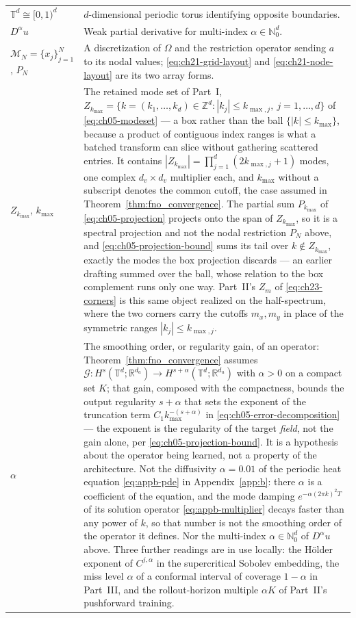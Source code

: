 {\begin{xltabular}{\textwidth}{@{}l>{\raggedright\arraybackslash}X@{}}
$\mathbb{T}^d \cong [0, 1)^d$ & $d$-dimensional periodic torus identifying opposite boundaries. \\
$D^\alpha u$ & Weak partial derivative for multi-index $\alpha \in \mathbb{N}_0^d$. \\
$\mathcal{M}_N = \{x_j\}_{j=1}^{N}$, $P_N$ & A discretization of $\Omega$ and the restriction operator sending $a$ to its nodal values; \eqref{eq:ch21-grid-layout} and \eqref{eq:ch21-node-layout} are its two array forms. \\
$Z_{k_{\max}}$, $k_{\max}$ & The retained mode set of Part~I, $Z_{k_{\max}} = \{k = (k_1, \dots, k_d) \in \mathbb{Z}^d : |k_j| \le k_{\max, j},\ j = 1, \dots, d\}$ of \eqref{eq:ch05-modeset} --- a box rather than the ball $\{|k| \le k_{\max}\}$, because a product of contiguous index ranges is what a batched transform can slice without gathering scattered entries. It contains $|Z_{k_{\max}}| = \prod_{j=1}^d (2k_{\max, j}+1)$ modes, one complex $d_v \times d_v$ multiplier each, and $k_{\max}$ without a subscript denotes the common cutoff, the case assumed in Theorem~\ref{thm:fno_convergence}. The partial sum $P_{k_{\max}}$ of \eqref{eq:ch05-projection} projects onto the span of $Z_{k_{\max}}$, so it is a spectral projection and not the nodal restriction $P_N$ above, and \eqref{eq:ch05-projection-bound} sums its tail over $k \notin Z_{k_{\max}}$, exactly the modes the box projection discards --- an earlier drafting summed over the ball, whose relation to the box complement runs only one way. Part~II's $Z_m$ of \eqref{eq:ch23-corners} is this same object realized on the half-spectrum, where the two corners carry the cutoffs $m_x, m_y$ in place of the symmetric ranges $|k_j| \le k_{\max, j}$. \\
$\alpha$ & The smoothing order, or regularity gain, of an operator: Theorem~\ref{thm:fno_convergence} assumes $\mathcal{G} : H^s(\mathbb{T}^d; \mathbb{R}^{d_a}) \to H^{s+\alpha}(\mathbb{T}^d; \mathbb{R}^{d_u})$ with $\alpha > 0$ on a compact set $K$; that gain, composed with the compactness, bounds the output regularity $s+\alpha$ that sets the exponent of the truncation term $C_1 k_{\max}^{-(s+\alpha)}$ in \eqref{eq:ch05-error-decomposition} --- the exponent is the regularity of the target \emph{field}, not the gain alone, per \eqref{eq:ch05-projection-bound}. It is a hypothesis about the operator being learned, not a property of the architecture. Not the diffusivity $\alpha = 0.01$ of the periodic heat equation \eqref{eq:appb-pde} in Appendix~\ref{app:b}: there $\alpha$ is a coefficient of the equation, and the mode damping $e^{-\alpha (2\pi k)^2 T}$ of its solution operator \eqref{eq:appb-multiplier} decays faster than any power of $k$, so that number is not the smoothing order of the operator it defines. Nor the multi-index $\alpha \in \mathbb{N}_0^d$ of $D^\alpha u$ above. Three further readings are in use locally: the H\"older exponent of $C^{j,\alpha}$ in the supercritical Sobolev embedding, the miss level $\alpha$ of a conformal interval of coverage $1-\alpha$ in Part~III, and the rollout-horizon multiple $\alpha K$ of Part~II's pushforward training. \\

\end{xltabular}}
